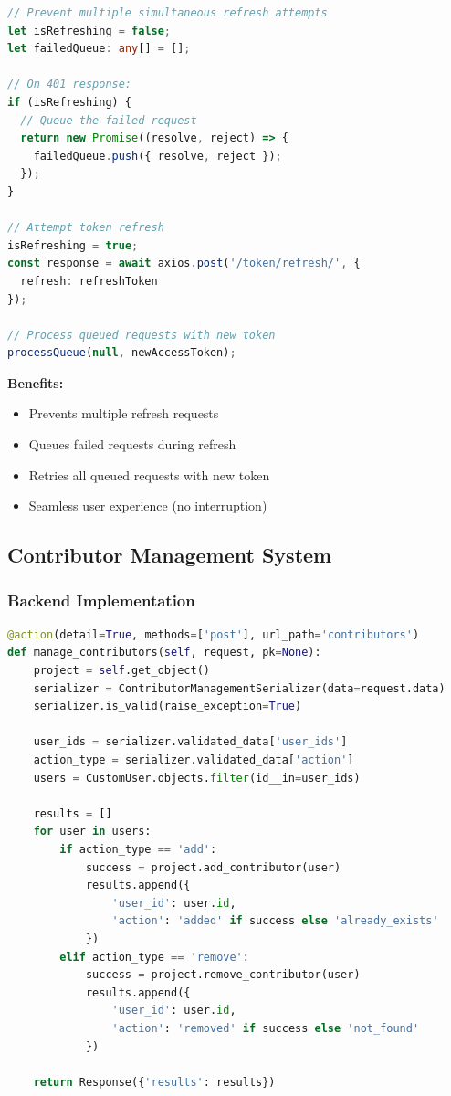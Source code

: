 \documentclass[11pt,a4paper]{article}
\begin{document}
\begin{lstlisting}[language=TypeScript]
// Prevent multiple simultaneous refresh attempts
let isRefreshing = false;
let failedQueue: any[] = [];

// On 401 response:
if (isRefreshing) {
  // Queue the failed request
  return new Promise((resolve, reject) => {
    failedQueue.push({ resolve, reject });
  });
}

// Attempt token refresh
isRefreshing = true;
const response = await axios.post('/token/refresh/', {
  refresh: refreshToken
});

// Process queued requests with new token
processQueue(null, newAccessToken);
\end{lstlisting}

\textbf{Benefits:}
\begin{itemize}[leftmargin=*]
    \item Prevents multiple refresh requests
    \item Queues failed requests during refresh
    \item Retries all queued requests with new token
    \item Seamless user experience (no interruption)
\end{itemize}

\subsection{Contributor Management System}

\subsubsection{Backend Implementation}
\begin{lstlisting}[language=Python]
@action(detail=True, methods=['post'], url_path='contributors')
def manage_contributors(self, request, pk=None):
    project = self.get_object()
    serializer = ContributorManagementSerializer(data=request.data)
    serializer.is_valid(raise_exception=True)
    
    user_ids = serializer.validated_data['user_ids']
    action_type = serializer.validated_data['action']
    users = CustomUser.objects.filter(id__in=user_ids)
    
    results = []
    for user in users:
        if action_type == 'add':
            success = project.add_contributor(user)
            results.append({
                'user_id': user.id,
                'action': 'added' if success else 'already_exists'
            })
        elif action_type == 'remove':
            success = project.remove_contributor(user)
            results.append({
                'user_id': user.id,
                'action': 'removed' if success else 'not_found'
            })
    
    return Response({'results': results})
\end{lstlisting}
\end{document}
